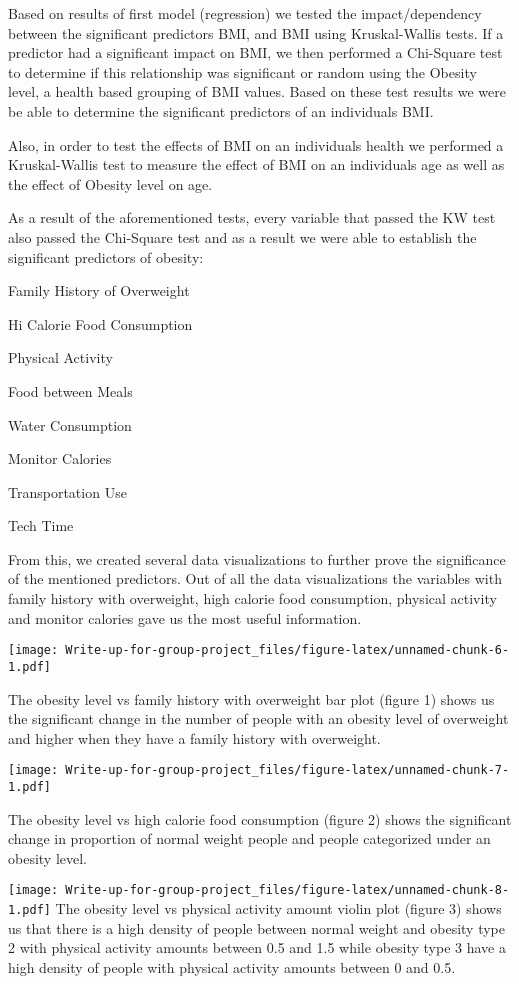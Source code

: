 \documentclass[
]{article}
\begin{document}
Based on results of first model (regression) we tested the
impact/dependency between the significant predictors BMI, and BMI using
Kruskal-Wallis tests. If a predictor had a significant impact on BMI, we
then performed a Chi-Square test to determine if this relationship was
significant or random using the Obesity level, a health based grouping
of BMI values. Based on these test results we were be able to determine
the significant predictors of an individuals BMI.

Also, in order to test the effects of BMI on an individuals health we
performed a Kruskal-Wallis test to measure the effect of BMI on an
individuals age as well as the effect of Obesity level on age.

As a result of the aforementioned tests, every variable that passed the
KW test also passed the Chi-Square test and as a result we were able to
establish the significant predictors of obesity:

Family History of Overweight

Hi Calorie Food Consumption

Physical Activity

Food between Meals

Water Consumption

Monitor Calories

Transportation Use

Tech Time

From this, we created several data visualizations to further prove the
significance of the mentioned predictors. Out of all the data
visualizations the variables with family history with overweight, high
calorie food consumption, physical activity and monitor calories gave us
the most useful information.

\texttt{[image: Write-up-for-group-project\_files/figure-latex/unnamed-chunk-6-1.pdf]}

The obesity level vs family history with overweight bar plot (figure 1)
shows us the significant change in the number of people with an obesity
level of overweight and higher when they have a family history with
overweight.

\texttt{[image: Write-up-for-group-project\_files/figure-latex/unnamed-chunk-7-1.pdf]}

The obesity level vs high calorie food consumption (figure 2) shows the
significant change in proportion of normal weight people and people
categorized under an obesity level.

\texttt{[image: Write-up-for-group-project\_files/figure-latex/unnamed-chunk-8-1.pdf]}
The obesity level vs physical activity amount violin plot (figure 3)
shows us that there is a high density of people between normal weight
and obesity type 2 with physical activity amounts between 0.5 and 1.5
while obesity type 3 have a high density of people with physical
activity amounts between 0 and 0.5.
\end{document}

